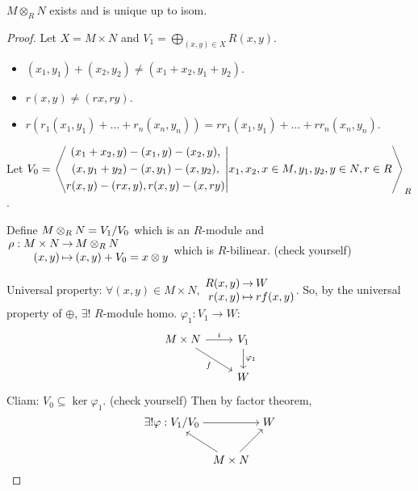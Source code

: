 \begin{theorem}
  $M \otimes_R N$ exists and is unique up to isom.
  \begin{proof}
    Let $X = M\times N$ and
    $\displaystyle V_1 = \bigoplus_{(x, y) \in X} R(x, y)$.
    \begin{itemize}
      \item $(x_1, y_1) + (x_2, y_2) \ne (x_1+x_2, y_1+y_2)$.
      \item $r(x, y) \ne (rx, ry)$.
      \item $r(r_1(x_1, y_1) + \dots + r_n(x_n, y_n)) =
        rr_1(x_1, y_1) + \dots + rr_n(x_n, y_n)$.
    \end{itemize}
    Let $V_0 = \gen*{
      \begin{gathered}
        (x_1+x_2, y) - (x_1, y) - (x_2, y), \\
        (x, y_1+y_2) - (x, y_1) - (x, y_2), \\
        r(x, y) - (rx, y), r(x, y) - (x, ry)
      \end{gathered}
      \middle| x_1, x_2, x \in M, y_1, y_2, y \in N, r \in R
    }_R$.

    Define $M \otimes_R N = \quot{V_1}{V_0}$ which is an $R$-module and
    $\arraycolsep=1pt
    \begin{array}{rcl}
      \rho: M \times N & \to & M \otimes_R N \\
      (x, y) & \mapsto & (x, y) + V_0 = x \otimes y
    \end{array}$
    which is $R$-bilinear. (check yourself)

    Universal property: $\forall (x, y) \in M \times N$,
    $\arraycolsep=1pt
    \begin{array}{rcl}
      R(x, y) & \to & W \\
      r(x, y) & \mapsto & rf(x, y)
    \end{array}$. So, by the universal property of $\oplus$,
    $\exists!$ $R$-module homo. $\varphi_1: V_1 \to W$:
    \[
      \begin{tikzcd}
      M\times N \arrow{r}{i} \arrow[swap]{dr}{f}
        & V_1 \arrow{d}{\varphi_1} \\
      & W
      \end{tikzcd}
    \]
    Cliam: $V_0 \subseteq \ker \varphi_1$. (check yourself)
    Then by factor theorem,
    \[
      \begin{tikzcd}[cramped, column sep=tiny]
        \exists! \varphi: \quot{V_1}{V_0} \arrow{rr} & & W \\
        & M \times N \arrow{ul} \arrow{ur} &
      \end{tikzcd}
      \qedhere
    \]
  \end{proof}
\end{theorem}

